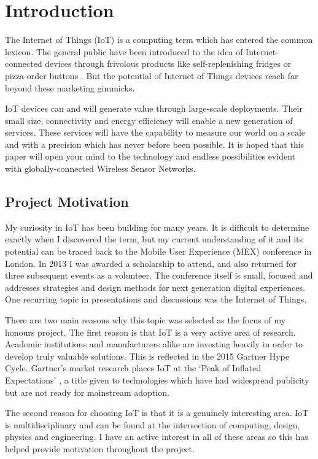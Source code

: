 \chapter{Introduction}
  The Internet of Things (IoT) is a computing term which has entered the common lexicon. The general public have been introduced to the idea of Internet-connected devices through frivolous products like self-replenishing fridges or pizza-order buttons \citep{dominos-order}. But the potential of Internet of Things devices reach far beyond these marketing gimmicks.

  IoT devices can and will generate value through large-scale deployments. Their small size, connectivity and energy efficiency will enable a new generation of services. These services will have the capability to measure our world on a scale and with a precision which has never before been possible. It is hoped that this paper will open your mind to the technology and endless possibilities evident with globally-connected Wireless Sensor Networks.

  \section{Project Motivation}
    My curiosity in IoT has been building for many years. It is difficult to determine exactly when I discovered the term, but my current understanding of it and its potential can be traced back to the Mobile User Experience (MEX) conference in London. In 2013 I was awarded a scholarship to attend, and also returned for three subsequent events as a volunteer. The conference itself is small, focused and addresses strategies and design methods for next generation digital experiences. One recurring topic in presentations and discussions was the Internet of Things.

    There are two main reasons why this topic was selected as the focus of my honours project. The first reason is that IoT is a very active area of research. Academic institutions and manufacturers alike are investing heavily in order to develop truly valuable solutions. This is reflected in the 2015 Gartner Hype Cycle. Gartner's market research places IoT at the `Peak of Inflated Expectations' \citep{gartner-hype-cycle}, a title given to technologies which have had widespread publicity but are not ready for mainstream adoption.

    The second reason for choosing IoT is that it is a genuinely interesting area. IoT is multidisciplinary and can be found at the intersection of computing, design, physics and engineering. I have an active interest in all of these areas so this has helped provide motivation throughout the project.

